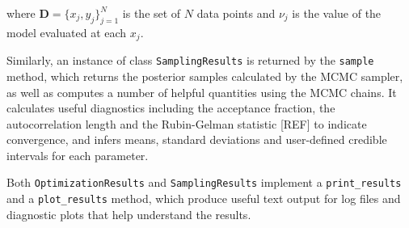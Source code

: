 \documentclass[12pt]{emulateapj}
\begin{document}
\noindent where $\mathbf{D} = \{x_j, y_j\}_{j=1}^{N}$ is the set of $N$ data points and $\nu_j$ is the value of the model evaluated at each $x_j$.

Similarly, an instance of class \verb|SamplingResults| is returned by the \verb|sample| method, which returns the posterior samples calculated by the MCMC sampler, as well as computes a number of helpful quantities using the MCMC chains. It calculates useful diagnostics including the acceptance fraction, the autocorrelation length and the Rubin-Gelman statistic [REF] to indicate convergence, and infers means, standard deviations and user-defined credible intervals for each parameter.

Both \verb|OptimizationResults| and \verb|SamplingResults| implement a \verb|print_results| and a \verb|plot_results| method, which produce useful text output for log files and diagnostic plots that help understand the results.
\end{document}
